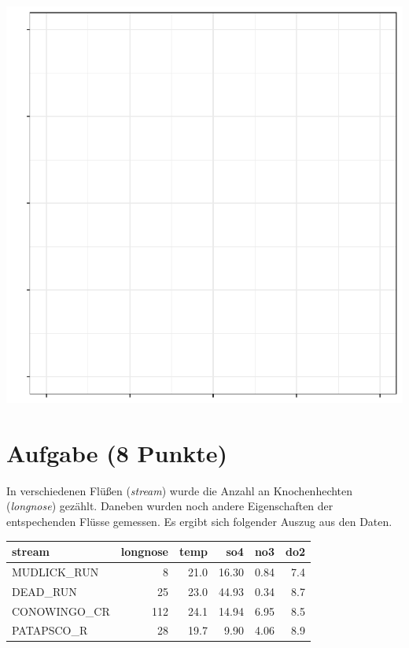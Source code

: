 \documentclass[a4paper, 10pt]{scrartcl}\usepackage[]{graphicx}\usepackage[]{xcolor}
\makeatletter
\def\maxwidth{ %
  \ifdim\Gin@nat@width>\linewidth
    \linewidth
  \else
    \Gin@nat@width
  \fi
}
\newenvironment{knitrout}{}{} %
\makeatother
\begin{document}
{\centering \includegraphics[width=\maxwidth]{img/modeling-R-01-1} 

}


 
\clearpage

\section{Aufgabe \hfill (8 Punkte)}



In verschiedenen Fl{\"u}{\ss}en (\textit{stream}) wurde die Anzahl an
Knochenhechten (\textit{longnose}) gez{\"a}hlt. Daneben wurden noch andere
Eigenschaften der entspechenden Fl{\"u}sse gemessen. Es ergibt sich folgender
Auszug aus den Daten. 


\begin{knitrout}
\color{fgcolor}\begin{table}[!h]
\centering
\begin{tabular}{lrrrrr}
\toprule
stream & longnose & temp & so4 & no3 & do2\\
\midrule
MUDLICK\_RUN & 8 & 21.0 & 16.30 & 0.84 & 7.4\\
DEAD\_RUN & 25 & 23.0 & 44.93 & 0.34 & 8.7\\
CONOWINGO\_CR & 112 & 24.1 & 14.94 & 6.95 & 8.5\\
PATAPSCO\_R & 28 & 19.7 & 9.90 & 4.06 & 8.9\\
\bottomrule
\end{tabular}
\end{table}

\end{knitrout}
\end{document}
